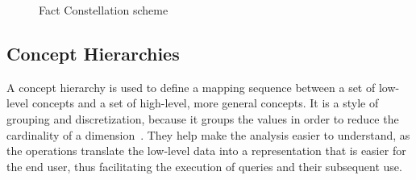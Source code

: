 \begin{figure}[!htb]
  \caption{Fact Constellation scheme}\label{fig:factconstschema}
  \vspace{6mm}
  \begin{center}
  \end{center}
  \vspace{2mm}
  \legenda{}
\end{figure}

\subsection{Concept Hierarchies}\label{ch:fun:cube:concept}

A concept hierarchy is used to define a mapping sequence between a set of low-level concepts and a set of high-level, more general concepts.
It is a style of grouping and discretization, because it groups the values in order to reduce the cardinality of a dimension~\cite{hanDataMiningConcepts2011}.
They help make the analysis easier to understand, as the operations translate the low-level data into a representation that is easier for the end user, thus facilitating the execution of queries and their subsequent use.

